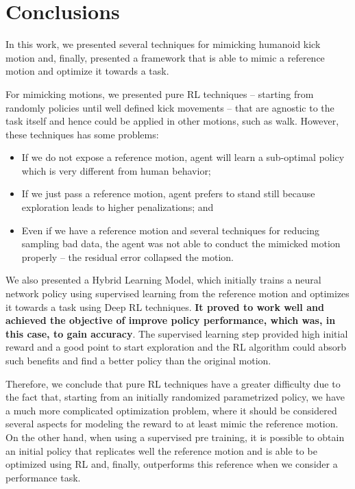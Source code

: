 \section{Conclusions}
In this work, we presented several techniques for mimicking humanoid kick motion and, finally, presented a framework that is able to mimic a reference motion and optimize it towards a task.

For mimicking motions, we presented pure RL techniques -- starting from randomly policies until well defined kick movements -- that are agnostic to the task itself and hence could be applied in other motions, such as walk. However, these techniques has some problems:

\begin{itemize}
	\item If we do not expose a reference motion, agent will learn a sub-optimal policy which is very different from human behavior;
	\item If we just pass a reference motion, agent prefers to stand still because exploration leads to higher penalizations; and
	\item Even if we have a reference motion and several techniques for reducing sampling bad data, the agent was not able to conduct the mimicked motion properly -- the residual error collapsed the motion.
\end{itemize}



We also presented a Hybrid Learning Model, which initially trains a neural network policy using supervised learning from the reference motion and optimizes it towards a task using Deep RL techniques. \textbf{It proved to work well and achieved the objective of improve policy performance, which was, in this case, to gain accuracy}. The supervised learning step provided high initial reward and a good point to start exploration and the RL algorithm could absorb such benefits and find a better policy than the original motion.

Therefore, we conclude that pure RL techniques have a greater difficulty due to the fact that, starting from an initially randomized parametrized policy, we have a much more complicated optimization problem, where it should be considered
several aspects for modeling the reward to at least mimic the reference motion. On the other hand, when using a supervised pre training, it is possible to obtain an initial policy that replicates well the reference motion and is able to be optimized using RL and, finally, outperforms this reference when we consider a performance task.

